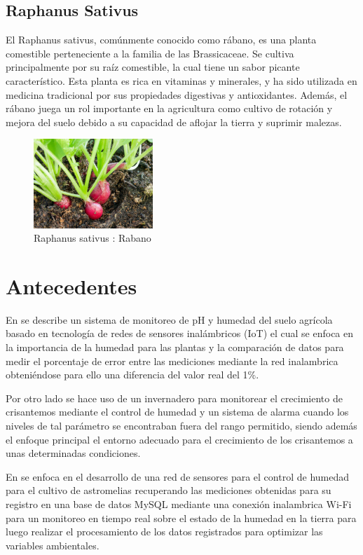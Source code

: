 \documentclass[conference]{IEEEtran}
\begin{document}
	\subsection{Raphanus Sativus}
	El Raphanus sativus, comúnmente conocido como rábano, es una planta comestible perteneciente a la familia de las Brassicaceae. Se cultiva principalmente por su raíz comestible, la cual tiene un sabor picante característico. Esta planta es rica en vitaminas y minerales, y ha sido utilizada en medicina tradicional por sus propiedades digestivas y antioxidantes. Además, el rábano juega un rol importante en la agricultura como cultivo de rotación y mejora del suelo debido a su capacidad de aflojar la tierra y suprimir malezas.
	
	\begin{figure}[h]
		\centering
		\includegraphics[width=0.4\textwidth]{media/raphanos.jpg}
		\caption{Raphanus sativus : Rabano}
		\label{fig:raphanus-sativus}
	\end{figure}
	
	\section{Antecedentes}
	En \cite{iotmonitoring} se describe un sistema de monitoreo de pH y humedad del suelo agrícola basado en tecnología de redes de sensores inalámbricos (IoT) el cual se enfoca en la importancia de la humedad para las plantas y la comparación de datos para medir el porcentaje de error entre las mediciones mediante la red inalambrica obteniéndose para ello una diferencia del valor real del 1\%.
	
	Por otro lado \cite{chrysanthemum} se hace uso de un invernadero para monitorear el crecimiento de crisantemos mediante el control de humedad y un sistema de alarma cuando los niveles de tal parámetro se encontraban fuera del rango permitido, siendo además el enfoque principal el entorno adecuado para el crecimiento de los crisantemos a unas determinadas condiciones.
	
	En \cite{astromelia} se enfoca en el desarrollo de una red de sensores para el control de humedad para el cultivo de astromelias recuperando las mediciones obtenidas para su registro en una base de datos MySQL mediante una conexión inalambrica Wi-Fi para un monitoreo en tiempo real sobre el estado de la humedad en la tierra para luego realizar el procesamiento de los datos registrados para optimizar las variables ambientales.
	
\end{document}
